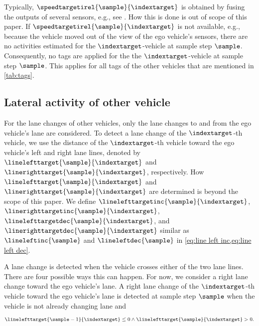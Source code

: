 \begin{remark}
	\label{rem:no target}
	\cstarta Typically, $\speedtargetirel{\sample}{\indextarget}$ is obtained by fusing the outputs of several sensors, e.g., see \autocite{elfring2016effective}. 
	How this is done is out of scope of this paper. 
	If $\speedtargetirel{\sample}{\indextarget}$ is not available, e.g., because the vehicle moved out of the view of the ego vehicle's sensors, there are no activities estimated for the $\indextarget$-vehicle at sample step $\sample$. \cenda
	\cstartc Consequently, no tags are applied for the the $\indextarget$-vehicle at sample step $\sample$. This applies for all tags of the other vehicles that are mentioned in \cref{tab:tags}.\cendc
\end{remark}



\subsection{Lateral activity of other vehicle}
\label{sec:lateral other vehicles}

\cstartc
For the lane changes of other vehicles, only the lane changes to and from the ego vehicle's lane are considered.
To detect a lane change of the $\indextarget$-th vehicle, we use the distance of the $\indextarget$-th vehicle toward the ego vehicle's left and right lane lines, denoted by $\linelefttarget{\sample}{\indextarget}$ and $\linerighttarget{\sample}{\indextarget}$, respectively. 
How $\linelefttarget{\sample}{\indextarget}$ and $\linerighttarget{\sample}{\indextarget}$ are determined is beyond the scope of this paper. 
We define $\linelefttargetinc{\sample}{\indextarget}$, $\linerighttargetinc{\sample}{\indextarget}$, $\linelefttargetdec{\sample}{\indextarget}$, and $\linerighttargetdec{\sample}{\indextarget}$ similar as $\lineleftinc{\sample}$ and $\lineleftdec{\sample}$ in \cref{eq:line left inc,eq:line left dec}.

A lane change is detected when the vehicle crosses either of the two lane lines.
There are four possible ways this can happen.
For now, we consider a right lane change toward the ego vehicle's lane.
A right lane change of the $\indextarget$-th vehicle toward the ego vehicle's lane is detected at sample step $\sample$ when the vehicle is not already changing lane and
\begin{equation}
	\label{eq:detect lane change target}
	\linelefttarget{\sample-1}{\indextarget} \leq 0 \land \linelefttarget{\sample}{\indextarget} > 0.
\end{equation}

